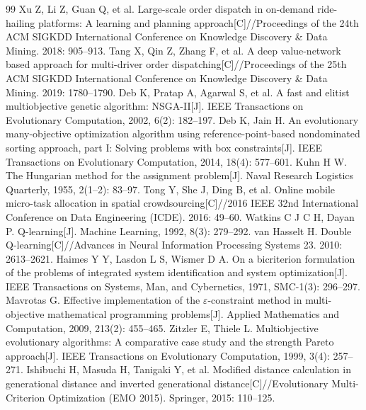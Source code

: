 \begin{thebibliography}{99}
\small
\setlength{\itemsep}{0pt}
 Xu Z, Li Z, Guan Q, et al. Large-scale order dispatch in on-demand ride-hailing platforms: A learning and planning approach[C]//Proceedings of the 24th ACM SIGKDD International Conference on Knowledge Discovery \& Data Mining. 2018: 905--913.
 Tang X, Qin Z, Zhang F, et al. A deep value-network based approach for multi-driver order dispatching[C]//Proceedings of the 25th ACM SIGKDD International Conference on Knowledge Discovery \& Data Mining. 2019: 1780--1790.
 Deb K, Pratap A, Agarwal S, et al. A fast and elitist multiobjective genetic algorithm: NSGA-II[J]. IEEE Transactions on Evolutionary Computation, 2002, 6(2): 182--197.
 Deb K, Jain H. An evolutionary many-objective optimization algorithm using reference-point-based nondominated sorting approach, part I: Solving problems with box constraints[J]. IEEE Transactions on Evolutionary Computation, 2014, 18(4): 577--601.
 Kuhn H W. The Hungarian method for the assignment problem[J]. Naval Research Logistics Quarterly, 1955, 2(1--2): 83--97.
 Tong Y, She J, Ding B, et al. Online mobile micro-task allocation in spatial crowdsourcing[C]//2016 IEEE 32nd International Conference on Data Engineering (ICDE). 2016: 49--60.
 Watkins C J C H, Dayan P. Q-learning[J]. Machine Learning, 1992, 8(3): 279--292.
 van Hasselt H. Double Q-learning[C]//Advances in Neural Information Processing Systems 23. 2010: 2613--2621.
 Haimes Y Y, Lasdon L S, Wismer D A. On a bicriterion formulation of the problems of integrated system identification and system optimization[J]. IEEE Transactions on Systems, Man, and Cybernetics, 1971, SMC-1(3): 296--297.
 Mavrotas G. Effective implementation of the $\varepsilon$-constraint method in multi-objective mathematical programming problems[J]. Applied Mathematics and Computation, 2009, 213(2): 455--465.
 Zitzler E, Thiele L. Multiobjective evolutionary algorithms: A comparative case study and the strength Pareto approach[J]. IEEE Transactions on Evolutionary Computation, 1999, 3(4): 257--271.
 Ishibuchi H, Masuda H, Tanigaki Y, et al. Modified distance calculation in generational distance and inverted generational distance[C]//Evolutionary Multi-Criterion Optimization (EMO 2015). Springer, 2015: 110--125.

\end{thebibliography}
